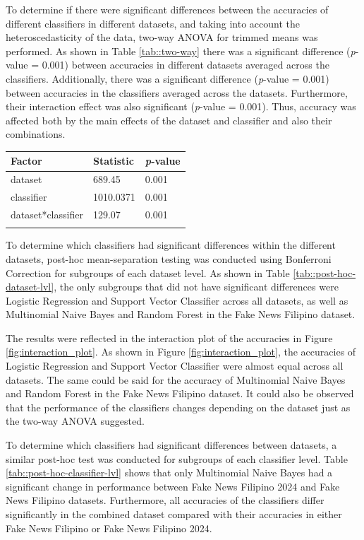 To determine if there were significant differences between the accuracies of different classifiers in different datasets, and taking into account the heteroscedasticity of the data, two-way ANOVA for trimmed means was performed. As shown in Table \ref{tab::two-way} there was a significant difference (\textit{p}-value = 0.001) between accuracies in different datasets averaged across the classifiers. Additionally, there was a significant difference (\textit{p}-value = 0.001) between accuracies in the classifiers averaged across the datasets. Furthermore, their interaction effect was also significant (\textit{p}-value = 0.001). Thus, accuracy was affected both by the main effects of the dataset and classifier and also their combinations.

\begin{tabularx}{\textwidth}{|l|l|l|}
    \hline
    Factor & Statistic & \textit{p}-value \\
    \hline
    dataset & 689.45 & 0.001 \\
    \hline
    classifier & 1010.0371 & 0.001 \\
    \hline
    dataset*classifier & 129.07 & 0.001 \\
    \hline
\caption{Two-way ANOVA for Trimmed Means.}
\label{tab::two-way}
\end{tabularx}

To determine which classifiers had significant differences within the different datasets, post-hoc mean-separation testing was conducted using Bonferroni Correction for subgroups of each dataset level. As shown in Table \ref{tab::post-hoc-dataset-lvl}, the only subgroups that did not have significant differences were Logistic Regression and Support Vector Classifier across all datasets, as well as Multinomial Naive Bayes and Random Forest in the Fake News Filipino dataset.

The results were reflected in the interaction plot of the accuracies in Figure \ref{fig:interaction_plot}. As shown in Figure \ref{fig:interaction_plot}, the accuracies of Logistic Regression and Support Vector Classifier were almost equal across all datasets. The same could be said for the accuracy of Multinomial Naive Bayes and Random Forest in the Fake News Filipino dataset. It could also be observed that the performance of the classifiers changes depending on the dataset just as the two-way ANOVA suggested.

To determine which classifiers had significant differences between datasets, a similar post-hoc test was conducted for subgroups of each classifier level. Table \ref{tab::post-hoc-classifier-lvl} shows that only Multinomial Naive Bayes had a significant change in performance between Fake News Filipino 2024 and Fake News Filipino datasets. Furthermore, all accuracies of the classifiers differ significantly in the combined dataset compared with their accuracies in either Fake News Filipino or Fake News Filipino 2024.

